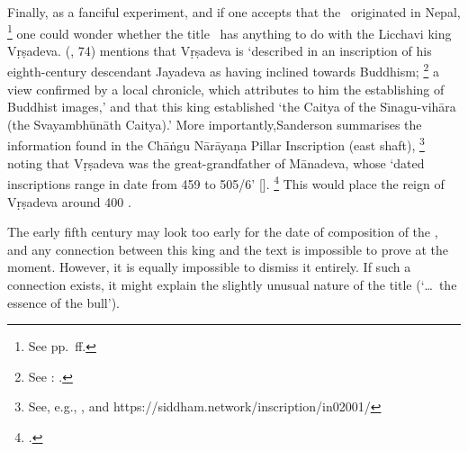 Finally, as a fanciful experiment, and if one accepts 
that the \VSS\ originated in Nepal,%
		\footnote{See pp.~\pageref{provenance}ff.}
one could wonder whether the title \Vss\ 
has anything to do with the Licchavi king Vṛṣadeva.
\citeauthor{SandersonSaivaAge} 
(\citeyear{SandersonSaivaAge}, 74) mentions that  
Vṛṣadeva is `described in an inscription of his eighth-century 
descendant Jayadeva as having inclined towards Buddhism;%
                 \footnote{See : .}
\linebreak a view confirmed by a local chronicle, which attributes to
him the establishing of Buddhist images,'
and that this king established 
`the Caitya of the Sı̄nagu-vihāra (the Svayambhūnāth Caitya).'
More importantly,\linebreak Sanderson summarises the 
information found in the Chāṅgu Nārāyaṇa Pillar Inscription (east shaft),%
                \footnote{See, e.g., \mycitep{GnoliNepInscr}{1},  and\phantom{\hskip10em}\linebreak 
		https://siddham.network/inscription/in02001/} 
noting that Vṛṣadeva was the great-grand\-father of Mānadeva, whose
`dated inscriptions range in date from 459 to 505/6' [\CE].%
                \footnote{.}
This would place the reign of Vṛṣadeva around 400 \CE. 

The early fifth century may look too early for the date of composition
of the \VSS, and any connection between this king
and the text is impossible to prove at the moment.
However, it is equally impossible to dismiss it entirely.
If such a connection exists, it might explain the slightly unusual nature of the title (`\dots\ the essence of the bull').
\hide{
}

%
%






